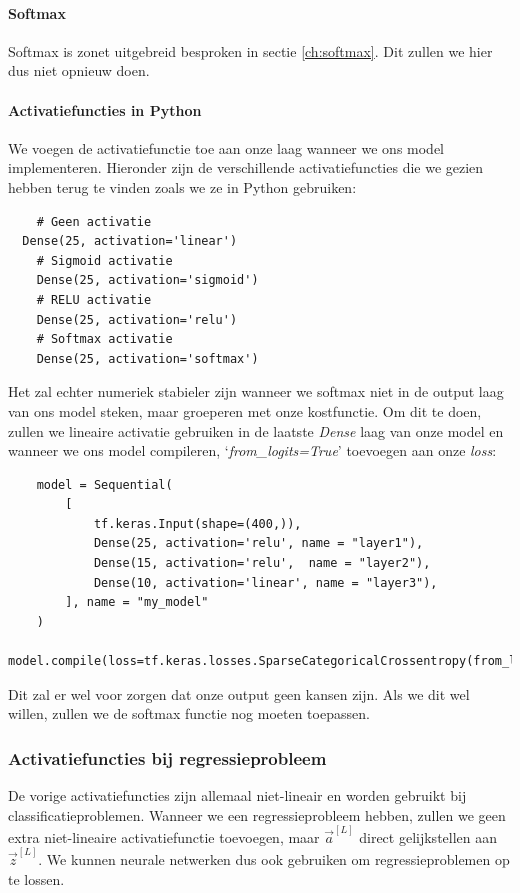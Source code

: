 \paragraph{Softmax}

Softmax is zonet uitgebreid besproken in sectie \ref{ch:softmax}. Dit zullen we hier dus niet opnieuw doen.

\paragraph{Activatiefuncties in Python}
We voegen de activatiefunctie toe aan onze laag wanneer we ons model implementeren. Hieronder zijn de verschillende activatiefuncties die we gezien hebben terug te vinden zoals we ze in Python gebruiken:

\begin{lstlisting}
	# Geen activatie
  Dense(25, activation='linear')
	# Sigmoid activatie
	Dense(25, activation='sigmoid')
	# RELU activatie
	Dense(25, activation='relu')
	# Softmax activatie
	Dense(25, activation='softmax')
\end{lstlisting}
\noindent
Het zal echter numeriek stabieler zijn wanneer we softmax niet in de output laag van ons model steken, maar groeperen met onze kostfunctie. Om dit te doen, zullen we lineaire activatie gebruiken in de laatste \textit{Dense} laag van onze model en wanneer we ons model compileren, `\textit{from\_logits=True}' toevoegen aan onze \textit{loss}:
\begin{lstlisting}
	model = Sequential(
	    [
	        tf.keras.Input(shape=(400,)),     
	        Dense(25, activation='relu', name = "layer1"),
	        Dense(15, activation='relu',  name = "layer2"),   
	        Dense(10, activation='linear', name = "layer3"),  
	    ], name = "my_model"
	)
	model.compile(loss=tf.keras.losses.SparseCategoricalCrossentropy(from_logits=True))
\end{lstlisting}
\noindent
Dit zal er wel voor zorgen dat onze output geen kansen zijn. Als we dit wel willen, zullen we de softmax functie nog moeten toepassen.

\subsubsection{Activatiefuncties bij regressieprobleem}

De vorige activatiefuncties zijn allemaal niet-lineair en worden gebruikt bij classificatieproblemen. Wanneer we een regressieprobleem hebben, zullen we geen extra niet-lineaire activatiefunctie toevoegen, maar $\vec{a}^{[L]}$ direct gelijkstellen aan $\vec{z}^{[L]}$. We kunnen neurale netwerken dus ook gebruiken om regressieproblemen op te lossen. 

